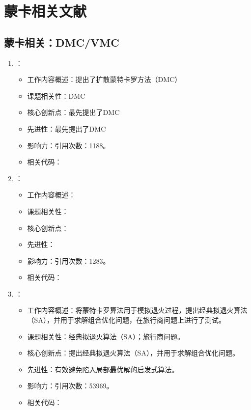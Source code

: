 \chapter{蒙卡相关文献}
\section{蒙卡相关：DMC/VMC}
    \begin{enumerate}
        \item \citet{anderson1975random}：
            \begin{itemize}
                \item 工作内容概述：提出了扩散蒙特卡罗方法（DMC）
                \item 课题相关性：DMC
                \item 核心创新点：最先提出了DMC
                \item 先进性：最先提出了DMC
                \item 影响力：引用次数：1188。
                \item 相关代码：
            \end{itemize}
        \item \citet{reynolds1982fixed}：
        \begin{itemize}
            \item 工作内容概述：
            \item 课题相关性：
            \item 核心创新点：
            \item 先进性：
            \item 影响力：引用次数：1283。
            \item 相关代码：
        \end{itemize}
        \item \citet{kirkpatrick1983optimization}：
        \begin{itemize}
            \item 工作内容概述：将蒙特卡罗算法用于模拟退火过程，提出经典拟退火算法（SA），并用于求解组合优化问题，在旅行商问题上进行了测试。
            \item 课题相关性：经典拟退火算法（SA）；旅行商问题。
            \item 核心创新点：提出经典拟退火算法（SA），并用于求解组合优化问题。
            \item 先进性：有效避免陷入局部最优解的启发式算法。
            \item 影响力：引用次数：53969。
            \item 相关代码：

\end{itemize}
\end{enumerate}
